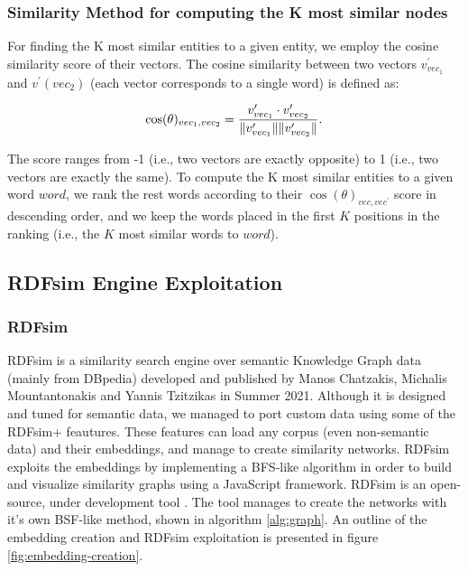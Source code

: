 \documentclass[sigconf, nonacm]{acmart}
\begin{document}
\subsubsection{Similarity Method for computing the K most similar nodes}
For finding the K most similar entities to a given entity, we employ the cosine similarity score of their vectors.  
The cosine similarity between  two vectors $v^{\prime}_{vec_1}$ and $v^{\prime}(vec_2)$ (each vector corresponds to a single word) is defined as: 

\begin{equation}
    \cos(\theta)_{vec_1,vec_2}={ {v^{\prime}_{vec_{1}}} \cdot  {v^{\prime}_{vec_{2}}}  \over \| {v^{\prime}_{vec_{1}}} \|\| {v^{\prime}_{vec_{2}}} \|}.
\end{equation}

The score ranges from -1 (i.e.,  two vectors are exactly opposite) to 1 (i.e., two vectors are exactly the same). 
To compute the K most similar entities to a given word $word$, we rank the rest words according to their  $\cos(\theta)_{vec,vec^{\prime}}$ score in descending order, 
and we keep the words placed in the first $K$ positions in the ranking (i.e., the $K$ most similar words to $word$). 

\subsection{RDFsim Engine Exploitation}
\subsubsection{RDFsim} 
RDFsim \cite{rdfsim} is a similarity search engine over semantic Knowledge Graph data (mainly from DBpedia) developed and published by Manos Chatzakis, Michalis Mountantonakis and Yannis Tzitzikas in Summer 2021. Although it is designed and tuned for semantic data, we managed to port custom data using some of the RDFsim+ feautures. These features can load any corpus (even non-semantic data) and their embeddings, and manage to create similarity networks. RDFsim exploits the embeddings by implementing a BFS-like algorithm in order to build and visualize similarity graphs using a JavaScript framework. RDFsim is an open-source, under development tool \cite{RDFsimcurrent, RDFsimdemo}. The tool manages to create the networks with it's own BSF-like method, shown in algorithm \ref{alg:graph}. An outline of the embedding creation and RDFsim exploitation is presented in figure \ref{fig:embedding-creation}.
\end{document}
